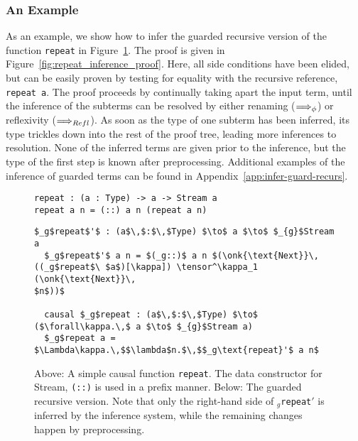\subsubsection{An Example}
As an example, we show how to infer the guarded recursive version of the
function \texttt{repeat} in Figure~\ref{fig:repeat_proof_example_program}. The
proof is given in Figure~\ref{fig:repeat_inference_proof}. Here, all side
conditions have been elided, but can be easily proven by testing for equality
with the recursive reference, \texttt{repeat a}. The proof proceeds by
continually taking apart the input term, until the inference of the subterms can
be resolved by either renaming ($\Longrightarrow_\phi$) or reflexivity
($\Longrightarrow_{Refl}$). As soon as the type of one subterm has been inferred, its
type trickles down into the rest of the proof tree, leading more inferences to
resolution. None of the inferred terms are given prior to the inference, but the
type of the first step is known after preprocessing. Additional examples of the
inference of guarded terms can be found in Appendix~\ref{app:infer-guard-recurs}.


\begin{figure}[h]
\begin{lstlisting}[mathescape]
repeat : (a : Type) -> a -> Stream a
repeat a n = (::) a n (repeat a n)
\end{lstlisting}
\begin{lstlisting}[mathescape]
  $_g$repeat$'$ : (a$\,$:$\,$Type) $\to$ a $\to$ $_{g}$Stream a
  $_g$repeat$'$ a n = $(_g::)$ a n $(\onk{\text{Next}}\,((_g$repeat$\ $a$)[\kappa]) \tensor^\kappa_1 (\onk{\text{Next}}\,
$n$))$

  causal $_g$repeat : (a$\,$:$\,$Type) $\to$ ($\forall\kappa.\,$ a $\to$ $_{g}$Stream a)
  $_g$repeat a = $\Lambda\kappa.\,$$\lambda$n.$\,$$_g\text{repeat}'$ a n$
\end{lstlisting}
  \caption{Above: A simple causal function \texttt{repeat}. The data constructor for
    Stream, \texttt{(::)} is used in a prefix manner. Below: The guarded
    recursive version. Note that only the right-hand side of
    \texttt{$_g$repeat$'$} is inferred by the inference system, while the
    remaining changes happen by preprocessing.}
\label{fig:repeat_proof_example_program}
\end{figure}



